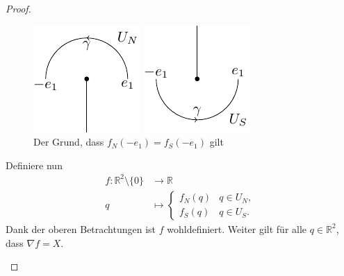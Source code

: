 \documentclass[../main.tex]{subfiles}
\begin{document}
\begin{proof}
\begin{enumerate}[(i)]
      \begin{figure}[htb]
        \centering
        \begin{minipage}{0.30\textwidth}
          \centering
          \includegraphics{figures/e1tominuse1}
        \end{minipage}%
        \begin{minipage}{0.30\textwidth}
          \centering
          \includegraphics{figures/minuse1toe1}
        \end{minipage}%
        \caption{Der Grund, dass $f_N(-e_1) =
        f_S(-e_1)$ gilt}%
        \label{fig:e1tominuse1}
      \end{figure}

      Definiere nun
      \begin{align*}
        f \colon \mathbb{R}^2 \setminus \{0\} & \to \mathbb{R} \\
        q & \mapsto
        \begin{cases}
          f_N(q) & q \in U_N, \\
          f_S(q) & q \in U_S.
        \end{cases}
      \end{align*}
      Dank der oberen Betrachtungen
      ist $f$ wohldefiniert.
      Weiter gilt für alle
      $q \in \mathbb{R}^2$, dass
      $\nabla f = X$.


\end{enumerate}
\end{proof}
\end{document}
